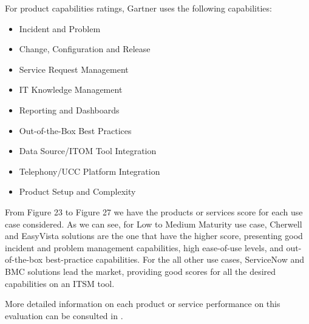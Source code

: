 For product capabilities ratings, Gartner uses the following capabilities:

\begin{itemize}
\item Incident and Problem
\item Change, Configuration and Release
\item Service Request Management
\item IT Knowledge Management
\item Reporting and Dashboards
\item Out-of-the-Box Best Practices
\item Data Source/ITOM Tool Integration
\item Telephony/UCC Platform Integration
\item Product Setup and Complexity
\end{itemize}

From Figure 23 to Figure 27 we have the products or services score for each use case considered. As we can see, for Low to Medium Maturity use case, Cherwell and EasyVista solutions are the one that have the higher score, presenting good incident and problem management capabilities, high ease-of-use levels, and out-of-the-box best-practice capabilities. For the all other use cases, ServiceNow and BMC solutions lead the market, providing good scores for all the desired capabilities on an ITSM tool.\par
More detailed information on each product or service performance on this evaluation can be consulted in \cite{GartnerCriticalCapabilities}.


